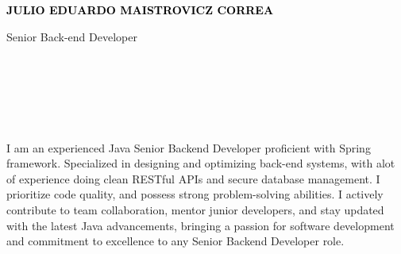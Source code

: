 \documentclass[9pt]{developercv} %
\begin{document}

\begin{minipage}[t]{0.5\textwidth} 
	\vspace{-\baselineskip} %
	
	{ \fontsize{16}{20} \textcolor{black}{\textbf{\MakeUppercase{Julio Eduardo Maistrovicz Correa}}}} %
	
	\vspace{6pt}
	
	{\Large Senior Back-end Developer } %
\end{minipage}
\hfill
\begin{minipage}[t]{0.2\textwidth} %
	\vspace{-\baselineskip} %
	
    \\
    \\
	
\end{minipage}
\begin{minipage}[t]{0.27\textwidth} %
	\vspace{-\baselineskip} %
	
	\\	
    \\    
    
\end{minipage}
\begin{minipage}[t]{0.46\textwidth}
	\vspace{-6pt}
 
    I am an experienced Java Senior Backend Developer proficient with Spring framework. Specialized in designing and optimizing back-end systems, with alot of experience doing clean RESTful APIs and secure database management. I prioritize code quality, and possess strong problem-solving abilities. I actively contribute to team collaboration, mentor junior developers, and stay updated with the latest Java advancements, bringing a passion for software development and commitment to excellence to any Senior Backend Developer role.
\end{minipage}
\end{document}
